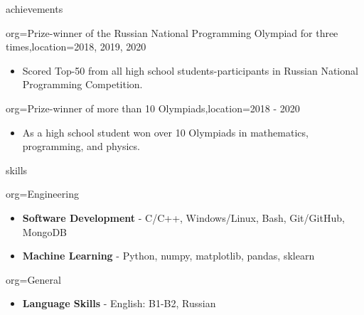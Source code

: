 \documentclass{resume}
\begin{document}
\begin{ResumeSection}{achievements}
    \begin{ResumeSubsection}{org=Prize-winner of the Russian National Programming Olympiad for three times,location={2018, 2019, 2020}}
        \begin{itemize}
            \item Scored Top-50 from all high school students-participants in Russian National\\ Programming Competition.
        \end{itemize}
    \end{ResumeSubsection}
    \begin{ResumeSubsection}{org=Prize-winner of more than 10 Olympiads,location={2018 - 2020}}
        \begin{itemize}
            \item As a high school student won over 10 Olympiads in mathematics, programming, and physics.
        \end{itemize}
    \end{ResumeSubsection}
\end{ResumeSection}

\begin{ResumeSection}{skills}
    \newcommand{\skill}[2]{\textbf{#1} - #2}
    \begin{ResumeSubsection}{org=Engineering}
        \begin{itemize}
            \item \skill{Software Development}{C/C++, Windows/Linux, Bash, Git/GitHub, MongoDB}
            \item \skill{Machine Learning}{Python, numpy, matplotlib, pandas, sklearn}
        \end{itemize}
    \end{ResumeSubsection}
    \begin{ResumeSubsection}{org=General}
        \begin{itemize}
            \item \skill{Language Skills}{English: B1-B2, Russian}
        \end{itemize}
    \end{ResumeSubsection}
\end{ResumeSection}
\end{document}
